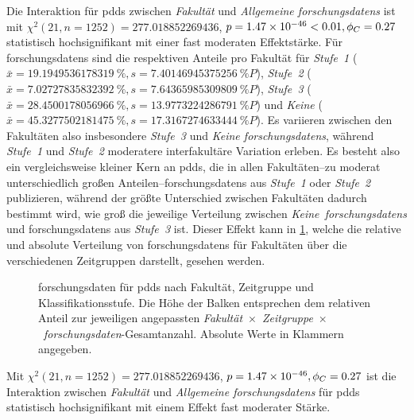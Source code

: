 Die Interaktion für \glspl{pdd} zwischen \textit{Fakultät} und \textit{Allgemeine \glspl{forschungsdaten}} ist mit $\chi^2 (\num{21}, n=\num{1252}) = \num[round-mode=places,round-precision=2]{277.018852269436}$, $p = \num[round-mode=places,round-precision=2]{1.46707274481795E-46}<\num{0.01},\phi_C=\num[round-mode=places,round-precision=2]{0.271576302422829}$ statistisch hochsignifikant mit einer fast moderaten Effektstärke.
Für \glspl{forschungsdaten} sind die respektiven Anteile pro Fakultät für \textit{Stufe~1} ($\bar{x}=\SI[round-mode=places,round-precision=2]{19.1949536178319}{\percent},s=\SI[round-mode=places,round-precision=2]{7.40146945375256}{\percent P}$), \textit{Stufe~2} ($\bar{x}=\SI[round-mode=places,round-precision=2]{7.02727835832392}{\percent},s=\SI[round-mode=places,round-precision=2]{7.64365985309809}{\percent P}$), \textit{Stufe~3} ($\bar{x}=\SI[round-mode=places,round-precision=2]{28.4500178056966}{\percent},s=\SI[round-mode=places,round-precision=2]{13.9773224286791}{\percent P}$) und \textit{Keine} ($\bar{x}=\SI[round-mode=places,round-precision=2]{45.3277502181475}{\percent},s=\SI[round-mode=places,round-precision=2]{17.3167274633444}{\percent P}$).
Es variieren zwischen den Fakultäten also insbesondere \textit{Stufe~3} und \textit{Keine \glspl{forschungsdaten}}, während \textit{Stufe~1} und \textit{Stufe~2} moderatere interfakultäre Variation erleben.
Es besteht also ein vergleichsweise kleiner Kern an \glspl{pdd}, die in allen Fakultäten--zu moderat unterschiedlich großen Anteilen--\glspl{forschungsdaten} aus \textit{Stufe~1} oder \textit{Stufe~2} publizieren, während der größte Unterschied zwischen Fakultäten dadurch bestimmt wird, wie groß die jeweilige Verteilung zwischen \textit{Keine~\glspl{forschungsdaten}} und \glspl{forschungsdaten} aus \textit{Stufe~3} ist.
Dieser Effekt kann in \cref{fig:luh-repo_fakultät_x_zeitgruppe_x_fd}, welche die relative und absolute Verteilung von \glspl{forschungsdaten} für Fakultäten über die verschiedenen Zeitgruppen darstellt, gesehen werden.
\begin{figure}[!htbp]
    \resizebox{\ifdim\width>\textwidth\textwidth\else\width\fi}{!}{}
    \caption{\gls{forschungsdaten} für \glspl{pdd} nach Fakultät, Zeitgruppe und Klassifikationsstufe.
    Die Höhe der Balken entsprechen dem relativen Anteil zur jeweiligen angepassten \textit{Fakultät}~$\times$~\textit{Zeitgruppe}~$\times$~\textit{\gls{forschungsdaten}}-Gesamtanzahl.
    Absolute Werte in Klammern angegeben.}
    \label{fig:luh-repo_fakultät_x_zeitgruppe_x_fd}
\end{figure}
Mit $\chi^2 (\num{21}, n=\num{1252}) = \num[round-mode=places,round-precision=2]{277.018852269436}$, $p = \num[round-mode=places,round-precision=2]{1.46707274481795E-46},\phi_C=\num[round-mode=places,round-precision=2]{0.271576302422829}$ ist die Interaktion zwischen \textit{Fakultät} und \textit{Allgemeine \glspl{forschungsdaten}} für \glspl{pdd} statistisch hochsignifikant mit einem Effekt fast moderater Stärke.

